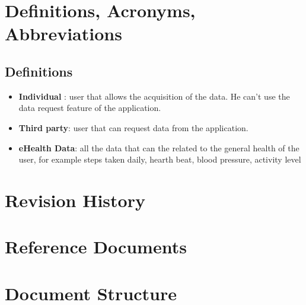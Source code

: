 \section{Definitions, Acronyms, Abbreviations}
\subsection{Definitions}
\begin{itemize}
\item \textbf{Individual} : user that allows the acquisition of the data. He can't use the data request feature of the application.
\item \textbf{Third party}: user that can request data from the application.
\item \textbf{eHealth Data}: all the data that can the related to the general health of the user, for example steps taken daily, hearth beat, blood pressure, activity level
\end{itemize}
\section{Revision History}
\section{Reference Documents}
\section{Document Structure}